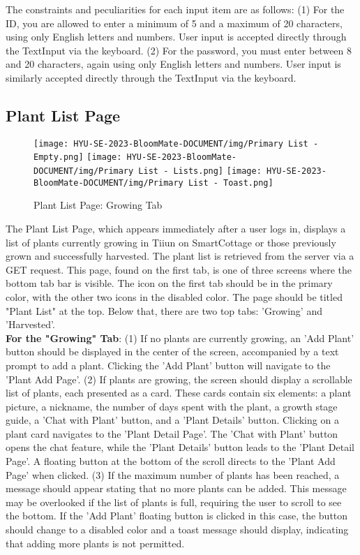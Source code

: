 \documentclass[conference, a4paper]{IEEEtran}
\begin{document}
The constraints and peculiarities for each input item are as follows: (1) For the ID, you are allowed to enter a minimum of 5 and a maximum of 20 characters, using only English letters and numbers. User input is accepted directly through the TextInput via the keyboard. (2) For the password, you must enter between 8 and 20 characters, again using only English letters and numbers. User input is similarly accepted directly through the TextInput via the keyboard.

\subsection{Plant List Page}
    \begin{figure}[h]
    \centerline{
        \texttt{[image: HYU-SE-2023-BloomMate-DOCUMENT/img/Primary List - Empty.png]}
        \texttt{[image: HYU-SE-2023-BloomMate-DOCUMENT/img/Primary List - Lists.png]}
        \texttt{[image: HYU-SE-2023-BloomMate-DOCUMENT/img/Primary List - Toast.png]}
    }
    \label{fig}
    \caption{Plant List Page: Growing Tab}
    \end{figure}

The Plant List Page, which appears immediately after a user logs in, displays a list of plants currently growing in Tiiun on SmartCottage or those previously grown and successfully harvested. The plant list is retrieved from the server via a GET request. This page, found on the first tab, is one of three screens where the bottom tab bar is visible. The icon on the first tab should be in the primary color, with the other two icons in the disabled color. The page should be titled "Plant List" at the top. Below that, there are two top tabs: 'Growing' and 'Harvested'.\\

\textbf{For the "Growing" Tab}: (1) If no plants are currently growing, an 'Add Plant' button should be displayed in the center of the screen, accompanied by a text prompt to add a plant. Clicking the 'Add Plant' button will navigate to the 'Plant Add Page'. (2) If plants are growing, the screen should display a scrollable list of plants, each presented as a card. These cards contain six elements: a plant picture, a nickname, the number of days spent with the plant, a growth stage guide, a 'Chat with Plant' button, and a 'Plant Details' button. Clicking on a plant card navigates to the 'Plant Detail Page'. The 'Chat with Plant' button opens the chat feature, while the 'Plant Details' button leads to the 'Plant Detail Page'. A floating button at the bottom of the scroll directs to the 'Plant Add Page' when clicked. (3) If the maximum number of plants has been reached, a message should appear stating that no more plants can be added. This message may be overlooked if the list of plants is full, requiring the user to scroll to see the bottom. If the 'Add Plant' floating button is clicked in this case, the button should change to a disabled color and a toast message should display, indicating that adding more plants is not permitted.\\
    
\end{document}

